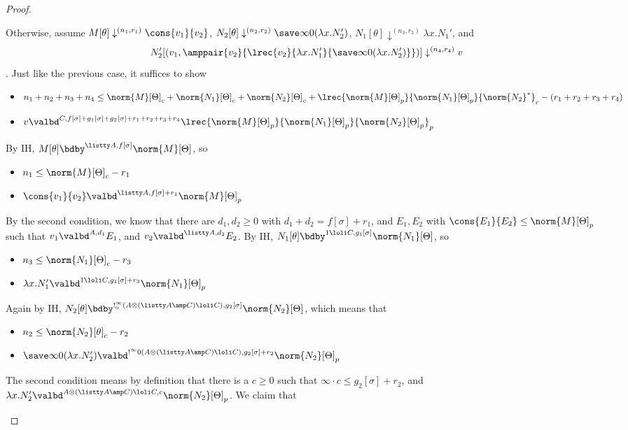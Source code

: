 \begin{proof}
\begin{itemize}
Otherwise, assume $M[\theta] \downarrow^{(n_1,r_1)} \cons {v_1} {v_2}$, $N_2[\theta] \downarrow^{(n_2,r_2)} \save \infty 0 {(\lambda x.N_2')}$, $N_1[\theta] \downarrow^{(n_3,r_3)} \lambda x.N_1'$, and $$N_2'[(v_1,\amppair {v_2} {\lrec {v_2} {\lambda x.N_1'} {\save \infty 0 {(\lambda x.N_2')}}})] \downarrow^{(n_4,r_4)} v$$.
Just like the previous case, it suffices to show
\begin{itemize}
  \item $n_1 + n_2 + n_3 + n_4 \leq \norm{M}[\Theta]_c + \norm{N_1}[\Theta]_c + \norm{N_2}[\Theta]_c + \lrec {\norm{M}[\Theta]_p} {\norm{N_1}[\Theta]_p} {\norm{N_2}^*}_c - (r_1 + r_2 + r_3 + r_4)$
  \item $v \valbd^{C,f[\sigma] + g_1[\sigma] + g_2[\sigma] + r_1 + r_2 + r_3 + r_4} \lrec {\norm{M}[\Theta]_p} {\norm{N_1}[\Theta]_p} {\norm{N_2}[\Theta]_p}_p$
\end{itemize}
By IH, $M[\theta] \bdby^{\listty A,f[\sigma]} \norm{M}[\Theta]$, so
\begin{itemize}
  \item $n_1 \leq \norm{M}[\Theta]_c - r_1$
  \item $\cons {v_1} {v_2} \valbd^{\listty A,f[\sigma] + r_1} \norm{M}[\Theta]_p$
\end{itemize}
By the second condition, we know that there are $d_1,d_2 \geq 0$ with $d_1 + d_2 = f[\sigma] + r_1$, and $E_1,E_2$ with $\cons {E_1} {E_2} \leq \norm{M}[\Theta]_p$ such that $v_1 \valbd^{A,d_1} E_1$, and $v_2 \valbd^{\listty A,d_2} E_2$.
By IH, $N_1[\theta] \bdby^{1 \loli C,g_1[\sigma]} \norm{N_1}[\Theta]$, so
\begin{itemize}
  \item $n_3 \leq \norm{N_1}[\Theta]_c - r_3$
  \item $\lambda x.N_1' \valbd^{1 \loli C,g_1[\sigma] + r_3} \norm{N_1}[\Theta]_p$
\end{itemize}
Again by IH, $N_2[\theta] \bdby^{!^\infty_0(A \otimes (\listty A \amp C) \loli C),g_2[\sigma]} \norm{N_2}[\Theta]$, which means that
\begin{itemize}
  \item $n_2 \leq \norm{N_2}[\theta]_c - r_2$
  \item $\save \infty 0 {(\lambda x.N_2')} \valbd^{!^\infty 0 (A \otimes (\listty A \amp C) \loli C),g_2[\sigma] + r_2} \norm{N_2}[\Theta]_p$
\end{itemize}
The second condition means by definition that there is a $c \geq 0$ such that $\infty \cdot c \leq g_2[\sigma] + r_2$, and $\lambda x.N_2' \valbd^{A \otimes (\listty A \amp C) \loli C,c} \norm{N_2}[\Theta]_p$. We claim that 


\end{itemize}
\end{proof}
